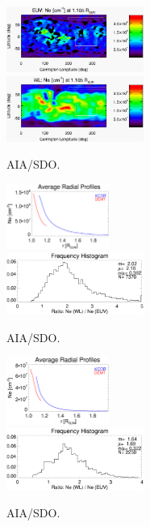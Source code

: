 \documentclass[baaa]{baaa}
\begin{document}
\begin{figure}
  \centering
  \includegraphics[width=0.4\textwidth]{figures/map_ne_aia.eps}\\
  \includegraphics[width=0.4\textwidth]{figures/map_ne_kcor.eps}
  \caption{AIA/SDO.}
  \label{fig_maps}
\end{figure}

\begin{figure}
  \centering
  \includegraphics[width=0.3\textwidth]{figures/Average_Radial_Profiles_KCOR-Tom_vs_DEMT_CR2198_Hh_l45_kcor_subreg-Quiet-region1.eps}\\
  \includegraphics[width=0.4\textwidth]{figures/comparison_KCOR-Tom_vs_DEMT_CR2198_Hh_l45_kcor_subreg-Quiet-region1_range1105-1195_Rsun.eps}	
  \caption{AIA/SDO.}
  \label{fig_averages}
\end{figure}

\begin{figure}
  \centering
  \includegraphics[width=0.3\textwidth]{figures/Average_Radial_Profiles_KCOR-Tom_vs_DEMT_CR2198_Hh_l45_kcor_subreg-Open-region_N.eps}\\
  \includegraphics[width=0.4\textwidth]{figures/comparison_KCOR-Tom_vs_DEMT_CR2198_Hh_l45_kcor_subreg-Open-region_N_range1105-1155_Rsun.eps}	
  \caption{AIA/SDO.}
  \label{fig_comparisson}
\end{figure}
\end{document}
